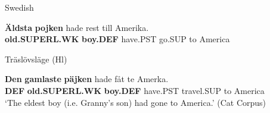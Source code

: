 \item 

Swedish



 \ea\label{}
\gll \textbf{Äldsta} \textbf{pojken} hade  rest  till  Amerika.\\


\textbf{old.SUPERL.WK} \textbf{boy.DEF} have.PST  go.SUP  to  America\\

\item 

Träslövsläge (Hl)



 \ea\label{}
\gll \textbf{Den}\textbf{  gamlaste}\textbf{  päjken} hade  fåt  te  Amerka.\\


\textbf{DEF} \textbf{old.SUPERL.WK} \textbf{boy.DEF} have.PST  travel.SUP  to  America\\

\glt ‘The eldest boy (i.e. Granny’s son) had gone to America.’ (Cat Corpus)

\z

